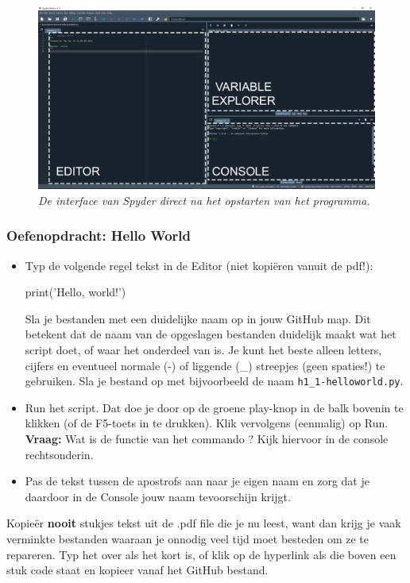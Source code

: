\documentclass[a4paper,11pt, fleqn]{article}
\begin{document}
\begin{figure}[h]
\includegraphics[width=16cm]{inc/h1/spyder_screenshot.png}
\caption{\it De interface van Spyder direct na het opstarten van het programma.}
\label{fig-spyder}
\end{figure}

\subsubsection*{Oefenopdracht: Hello World} 
\begin{itemize}
	\item Typ de volgende regel tekst in de Editor (niet kopi\"eren vanuit de pdf!): 
	\begin{python}
print('Hello, world!')
	\end{python}
	Sla je bestanden met een duidelijke naam op in jouw GitHub map. Dit betekent dat de naam van de opgeslagen bestanden duidelijk maakt wat het script doet, of waar het onderdeel van is. Je kunt het beste alleen letters, cijfers en eventueel normale (-) of liggende (\_) streepjes (geen spaties!) te gebruiken. Sla je bestand op met bijvoorbeeld de naam \verb,h1_1-helloworld.py,.
	\item Run het script.  Dat doe je door op de groene play-knop in de balk bovenin te klikken (of de F5-toets in te drukken). Klik vervolgens (eenmalig) op Run.\\
	{\bf Vraag:} Wat is de functie van het commando ? Kijk hiervoor in de console rechtsonderin.
	\item Pas de tekst tussen de apostrofs aan naar je eigen naam en zorg dat je daardoor in de Console jouw naam tevoorschijn krijgt.
\end{itemize}

Kopie\"{e}r \textbf{nooit} stukjes tekst uit de .pdf file die je nu leest, want dan krijg je vaak verminkte bestanden waaraan je onnodig veel tijd moet besteden om ze te repareren. Typ het over als het kort is, of klik op de hyperlink als die boven een stuk code staat en kopieer vanaf het GitHub bestand.
\end{document}
